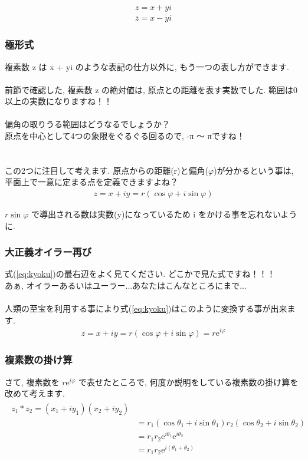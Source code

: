 \documentclass[11pt,a4paper]{jsarticle}
\begin{document}
\begin{eqnarray}
z = x + yi
\end{eqnarray}
\begin{eqnarray}
\overline{z} = x - yi
\end{eqnarray}
\subsubsection{極形式}
複素数 z は x + yi のような表記の仕方以外に, もう一つの表し方ができます.\\
\\
前節で確認した, 複素数 z の絶対値は, 原点との距離を表す実数でした. 範囲は0以上の実数になりますね！！\\
\\
偏角の取りうる範囲はどうなるでしょうか？\\
原点を中心として4つの象限をぐるぐる回るので, -π ～ πですね！\\
\\
\\
この2つに注目して考えます. 原点からの距離(r)と偏角($\varphi$)が分かるという事は, 平面上で一意に定まる点を定義できますよね？
\begin{eqnarray}
z = x + iy = r(\cos \varphi + i\sin \varphi)
\label{eq:kyoku}
\end{eqnarray}

$r\sin\varphi$ で導出される数は実数(y)になっているため i をかける事を忘れないように.\\

\subsubsection{大正義オイラー再び}
式(\ref{eq:kyoku})の最右辺をよく見てください. どこかで見た式ですね！！！\\
あぁ, オイラーあるいはユーラー...あなたはこんなところにまで...\\
\\
人類の至宝を利用する事により式(\ref{eq:kyoku})はこのように変換する事が出来ます.\\
\begin{eqnarray}
z = x + iy = r(\cos\varphi + i\sin \varphi) = r \mathrm{e}^{i\varphi}
\end{eqnarray}

\subsubsection{複素数の掛け算}
さて, 複素数を $r\mathrm{e}^{i\varphi}$ で表せたところで, 何度か説明をしている複素数の掛け算を改めて考えます.\\
\begin{eqnarray}
\begin{split}
z_1 * z_2 = (x_1 + iy_1)(x_2 + iy_2)\\
&= r_1(\cos\theta_1 + i\sin\theta_1)r_2(\cos\theta_2 + i\sin\theta_2)\\
&= r_1r_2\mathrm{e}^{i\theta_1} \mathrm{e}^{i\theta_2}\\
&= r_1r_2\mathrm{e}^{i(\theta_1 + \theta_2)}
\end{split}
\end{eqnarray}
\end{document}
